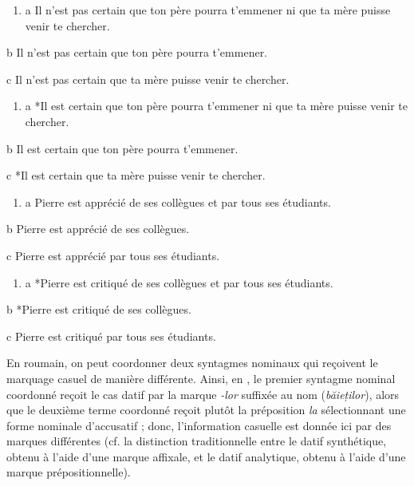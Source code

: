 \begin{enumerate}
\item \label{bkm:Ref300597513}a  Il n'est pas certain que ton père pourra t'emmener ni que ta mère puisse venir te chercher.


\end{enumerate}
  b  Il n'est pas certain que ton père pourra t'emmener.

  c  Il n'est pas certain que ta mère puisse venir te chercher.


\begin{enumerate}
\item \label{bkm:Ref300597641}a  *Il est certain que ton père pourra t'emmener ni que ta mère puisse venir te chercher.


\end{enumerate}
  b  Il est certain que ton père pourra t'emmener.

  c  *Il est certain que ta mère puisse venir te chercher.


\begin{enumerate}
\item \label{bkm:Ref300598417}a  Pierre est apprécié de ses collègues et par tous ses étudiants.


\end{enumerate}
  b  Pierre est apprécié de ses collègues.

  c  Pierre est apprécié par tous ses étudiants.


\begin{enumerate}
\item \label{bkm:Ref300598419}a  *Pierre est critiqué de ses collègues et par tous ses étudiants.


\end{enumerate}
  b  *Pierre est critiqué de ses collègues.

  c  Pierre est critiqué par tous ses étudiants.

En roumain, on peut coordonner deux syntagmes nominaux qui reçoivent le marquage casuel de manière différente. Ainsi, en , le premier syntagme nominal coordonné reçoit le cas datif par la marque \textit{-lor} suffixée au nom (\textit{băieților}), alors que le deuxième terme coordonné reçoit plutôt la préposition \textit{la} sélectionnant une forme nominale d'accusatif ; donc, l'information casuelle est donnée ici par des marques différentes (cf. la distinction traditionnelle entre le datif synthétique, obtenu à l'aide d'une marque affixale, et le datif analytique, obtenu à l'aide d'une marque prépositionnelle). 


